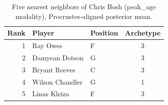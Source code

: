 \begin{table}[htbp]
  \centering\small
  \begin{tabular}{rllc}
    \toprule
    Rank & Player & Position & Archetype \\
    \midrule
    1 & Ray Owes & F & 3 \\
    2 & Damyean Dotson & G & 3 \\
    3 & Bryant Reeves & C & 3 \\
    4 & Wilson Chandler & G & 1 \\
    5 & Linas Kleiza & F & 3 \\
    \bottomrule
  \end{tabular}
  \caption{Five nearest neighbors of Chris Bosh (peak_age modality), Procrustes-aligned posterior mean.}
  \label{tab:Chris_Bosh_neighbors_peak_age}
\end{table}

